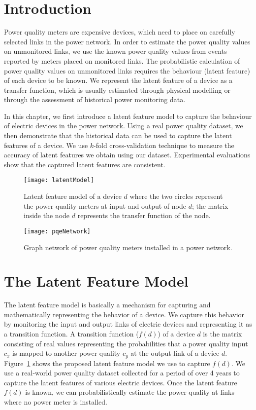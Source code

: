\label{chap:latentF}
\section{Introduction}
Power quality meters are expensive devices, which need to place on carefully selected links in the power network. In order to estimate the power quality values on unmonitored links, we use the known power quality values from events reported by meters placed on monitored links. The probabilistic calculation of power quality values on unmonitored links requires the behaviour (latent feature) of each device to be known. We represent the latent feature of a device as a transfer function, which is usually estimated through physical modelling or through the assessment of historical power monitoring data.

In this chapter, we first introduce a latent feature model to capture the behaviour of electric devices in the power network. Using a real power quality dataset, we then demonstrate that the historical data can be used to capture the latent features of a device. We use $k$-fold cross-validation technique to measure the accuracy of latent features we obtain using our dataset. Experimental evaluations show that the captured latent features are consistent.

\begin{figure}[!t]
\center
\texttt{[image: latentModel]}
\caption{Latent feature model of a device $d$ where the two circles represent the power quality meters at input and output of node $d$; the matrix inside the node $d$ represents the transfer function of the node.}
\label{fig:latentModel}

\end{figure}

\begin{figure}[!t]
\center
\texttt{[image: pqeNetwork]}
\caption{Graph network of power quality meters installed in a power network.}
\label{fig:pqeNetwork}
\end{figure}

\section{The Latent Feature Model}
The latent feature model is basically a mechanism for capturing and mathematically representing the behavior of a device. We capture this behavior by monitoring the input and output links of electric devices and representing it as a transition function. A transition function ($f(d)$) of a device $d$ is the matrix consisting of real values representing the probabilities that a power quality input $c_x$ is mapped to another power quality $c_y$ at the output link of a device $d$. Figure~\ref{fig:latentModel} shows the proposed latent feature model we use to capture $f(d)$. We use a real-world power quality dataset collected for a period of over 4 years to capture the latent features of various electric devices. Once the latent feature $f(d)$ is known, we can probabilistically estimate the power quality at links where no power meter is installed.

